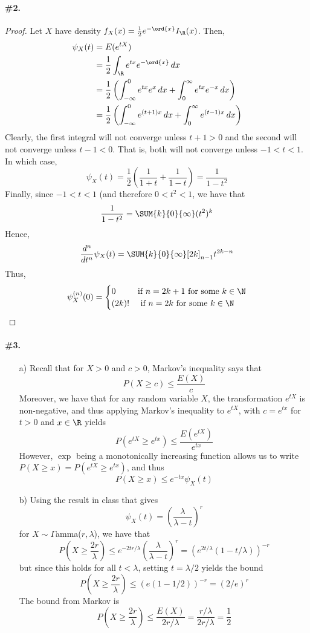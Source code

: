 \documentclass[12pt,titlepage]{article}\usepackage{graphicx, color}
\begin{document}
\paragraph{\#2.}
\begin{proof}
Let $X$ have density $f_{X}(x) = \frac{1}{2} e^{-\ord{x}} I_{\R}(x)$. Then, 
\begin{align*}
\psi_{X}(t) &= E(e^{tX}) \\
&= \frac{1}{2}\int_{\R} e^{tx} e^{-\ord{x}} \, dx \\
&= \frac{1}{2} \left( \int_{-\infty}^{0} e^{tx}e^{x} \, dx + \int_{0}^{\infty} e^{tx} e^{-x} \, dx \right) \\
&= \frac{1}{2}\left( \int_{-\infty}^{0} e^{(t+1)x} \, dx + \int_{0}^{\infty} e^{(t-1)x}  \, dx\right)
\end{align*}
Clearly, the first integral will not converge unless $t+1 > 0$ and the second will not converge unless $t-1 < 0$. That is, both will not converge unless $-1 < t < 1$. In which case, 
\[
\psi_{X}(t) = \frac{1}{2}\left(\frac{1}{1+t} + \frac{1}{1-t}\right) = \frac{1}{1-t^2}
\]
Finally, since $-1 < t < 1$ (and therefore $0 < t^2 <1$, we have that 
\[
\frac{1}{1-t^2} = \SUM{k}{0}{\infty} (t^2)^{k}
\]
Hence,
\[
\frac{d^n}{dt^n}\psi_{X}(t) = \SUM{k}{0}{\infty}[2k]_{n-1} t^{2k-n}
\]
Thus,
\[
\psi_{X}^{(n)}(0) = 
\begin{cases}
0 &\text{if $n = 2k+1$ for some $k \in \N$} \\
(2k)! &\text{ if $n = 2k$ for some $k \in \N$}
\end{cases}
\]
\end{proof}

\paragraph{\#3.}
\begin{enumerate}
\item[a)] Recall that for $X > 0$ and $c > 0$, Markov's inequality says that 
\[
P(X \geq c) \leq \frac{E(X)}{c}
\]
Moreover, we have that for any random variable $X$, the transformation $e^{tX}$ is non-negative, and thus applying Markov's inequality to $e^{tX}$, with $c = e^{tx}$ for $t > 0$ and $x \in \R$ yields
\[
P\left( e^{tX} \geq e^{tx} \right) \leq \frac{E(e^{tX})}{e^{tx}}
\]
However, $\exp$ being a monotonically increasing function allows us to write $P(X \geq x ) = P(e^{tX} \geq e^{tx})$, and thus
\[
P(X \geq x) \leq e^{-tx}\psi_{X}(t)
\]
\item[b)] Using the result in class that gives
\[
\psi_{X}(t) = \left(\frac{\lambda}{\lambda - t}\right)^{r}
\]
for $X \sim \Gamma$amma($r,\lambda$), we have that 
\[
P\left(X \geq \frac{2r}{\lambda} \right) \leq e^{-2tr/\lambda} \left(\frac{\lambda}{\lambda-t}\right)^{r} = \left( e^{2t/\lambda}(1-t/\lambda)\right)^{-r}
\]
but since this holds for all $t < \lambda$, setting $t = \lambda/2$ yields the bound
\[
P\left(X \geq \frac{2r}{\lambda} \right) \leq (e(1-1/2))^{-r} = (2/e)^{r}
\]
The bound from Markov is
\[
P\left(X \geq \frac{2r}{\lambda} \right) \leq \frac{E(X)}{2r/\lambda} = \frac{r/\lambda}{2r/\lambda} = \frac{1}{2}
\]
\end{enumerate}
\end{document}
